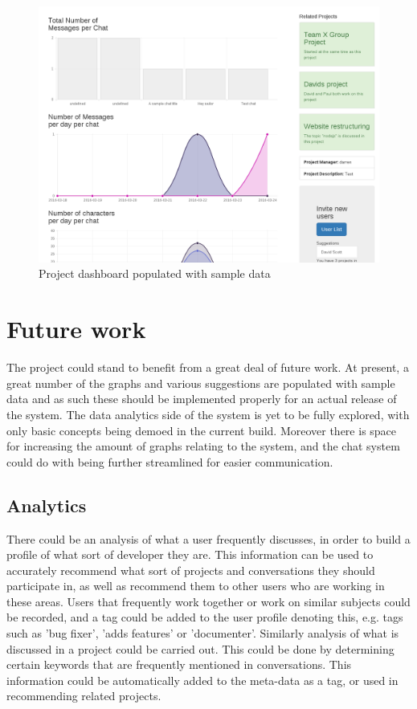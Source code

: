 \documentclass{l4proj}
\begin{document}
\begin{figure}[h]
\includegraphics[scale=0.50]{project-dashboard.png}
\centering
\caption{Project dashboard populated with sample data}
\label{fig:11}
\end{figure}

\chapter{Future work}

The project could stand to benefit from a great deal of future work.  At present, a great number of the graphs and various suggestions are populated with sample data and as such these should be implemented properly for an actual release of the system.  The data analytics side of the system is yet to be fully explored, with only basic concepts being demoed in the current build. Moreover there is space for increasing the amount of graphs relating to the system, and the chat system could do with being further streamlined for easier communication.

\section{Analytics}

There could be an analysis of what a user frequently discusses, in order to build a profile of what sort of developer they are.  This information can be used to accurately recommend what sort of projects and conversations they should participate in, as well as recommend them to other users who are working in these areas.  Users that frequently work together or work on similar subjects could be recorded, and a tag could be added to the user profile denoting this, e.g. tags such as 'bug fixer', 'adds features' or 'documenter'. Similarly analysis of what is discussed in a project could be carried out.  This could be done by determining certain keywords that are frequently mentioned in conversations.  This information could be automatically added to the meta-data as a tag, or used in recommending related projects.
\end{document}
